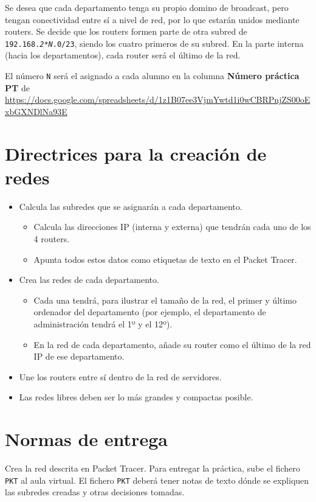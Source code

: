 Se desea que cada departamento tenga su propio domino de broadcast, pero tengan conectividad entre sí a nivel de red, por lo que estarán unidos mediante routers. Se decide que los routers formen parte de otra subred de  \texttt{192.168.\textit{2*N}.0/23}, siendo los cuatro primeros de su subred. En la parte interna (hacia los departamentos), cada router será el último de la red.

El número \texttt{N} será el asignado a cada alumno en la columna \textbf{Número práctica PT} de \\ \href{https://docs.google.com/spreadsheets/d/1z1B07ee3VjmYwtd1i0wCBRPnjZS00oExbGXNDlNa93E}{https://docs.google.com/spreadsheets/d/1z1B07ee3VjmYwtd1i0wCBRPnjZS00oExbGXNDlNa93E}

\section{Directrices para la creación de redes}
\begin{itemize}
\item Calcula las subredes que se asignarán a cada departamento.
  \begin{itemize}
  \item Calcula las direcciones IP (interna y externa) que tendrán cada uno de los 4 routers.
  \item Apunta todos estos datos como etiquetas de texto en el Packet Tracer.
  \end{itemize}
\item Crea las redes de cada departamento.
  \begin{itemize}
  \item Cada una tendrá, para ilustrar el tamaño de la red, el primer y último ordenador del departamento (por ejemplo, el departamento de administración tendrá el 1º y el 12º).
  \item En la red de cada departamento, añade su router como el último de la red IP de ese departamento.
  \end{itemize}
\item Une los routers entre sí dentro de la red de servidores.
  
\item Las redes libres deben ser lo más grandes y compactas posible.
\end{itemize}


\section{Normas de entrega}
Crea la red descrita en Packet Tracer. Para entregar la práctica, sube el fichero \texttt{PKT} al aula virtual. El fichero \texttt{PKT} deberá tener notas de texto dónde se expliquen las subredes creadas y otras decisiones tomadas.

